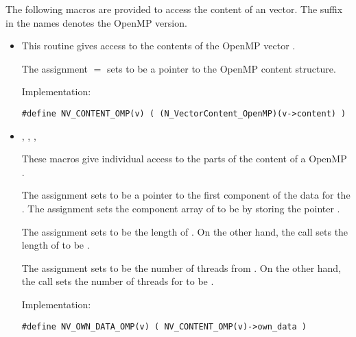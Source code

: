 The following macros are provided to access the content of an {\nvecopenmp}
vector. The suffix  in the names denotes the OpenMP version.
\begin{itemize}

\item {}                             
    
  This routine gives access to the contents of the OpenMP
  vector .
  
  The assignment  $=$  sets           
   to be a pointer to the OpenMP  content  
  structure.                                             
                                                            
  Implementation: 
  
  \verb|#define NV_CONTENT_OMP(v) ( (N_VectorContent_OpenMP)(v->content) )|
  
\item {}, , , 


  These macros give individual access to the parts of    
  the content of a OpenMP .                        
                                                               
  The assignment  sets  to be     
  a pointer to the first component of the data for the  . 
  The assignment  sets the component array of  to     
  be  by storing the pointer .                   
  
  The assignment  sets  to be     
  the length of . On the other hand, the call  
  sets the length of  to be .
                                                            
  The assignment  sets  to be     
  the number of threads from . On the other hand, the call  
  sets the number of threads for  to be .
                                                            
  Implementation: 
  
  \verb|#define NV_OWN_DATA_OMP(v) ( NV_CONTENT_OMP(v)->own_data )|


\end{itemize}
